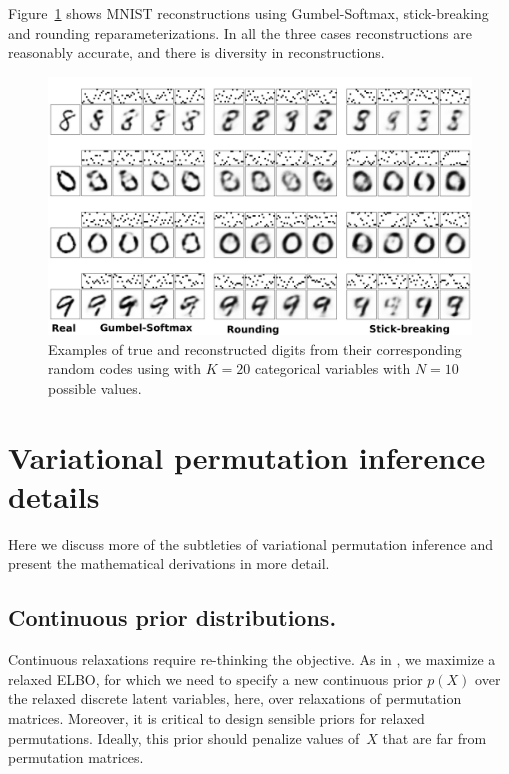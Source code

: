 \documentclass[twoside]{article}
\begin{document}

Figure~\ref{fig:VAE} shows MNIST reconstructions using Gumbel-Softmax,
stick-breaking and rounding reparameterizations. In all the three
cases reconstructions are reasonably accurate, and there is diversity
in reconstructions.
\begin{figure}[t]
  \centering
  \includegraphics[width=6.in]{../figures/figure4.pdf} 
  \caption{Examples of true and reconstructed digits from their corresponding random codes using with $K=20$ categorical variables with $N=10$ possible values.
  }
\label{fig:VAE}
\end{figure}


\section{Variational permutation inference details}

Here we discuss more of the subtleties of variational permutation
inference and present the mathematical derivations in more detail. 

\subsection{Continuous prior distributions.} 
Continuous relaxations require re-thinking the objective. As in
\cite{maddison2016concrete}, we maximize a relaxed ELBO, for which we
need to specify a new continuous prior $p(X)$ over the relaxed
discrete latent variables, here, over relaxations of permutation
matrices. Moreover, it is critical to design sensible priors for
relaxed permutations.  Ideally, this prior should penalize values
of~$X$ that are far from permutation matrices.
\end{document}
